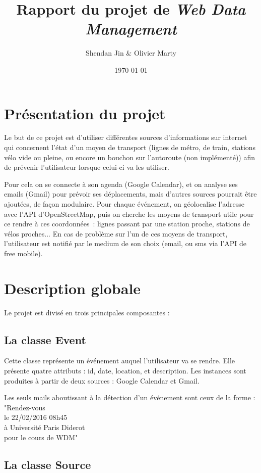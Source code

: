 \documentclass[a4paper, 8pt]{article}
\title{\vspace{-2cm}Rapport du projet de \emph{Web Data Management}}
\author{Shendan Jin \& Olivier Marty}
\date\today
\begin{document}
\maketitle

\section{Présentation du projet}

Le but de ce projet est d'utiliser différentes sources d'informations sur
internet qui concernent l'état d'un moyen de transport (lignes de
métro, de train, stations vélo vide ou pleine, ou encore un bouchon sur
l'autoroute (non implémenté)) afin de prévenir l'utilisateur lorsque celui-ci va
les utiliser.

Pour cela on se connecte à son agenda (Google Calendar), et on analyse ses emails
(Gmail) pour prévoir ses déplacements, mais d'autres sources pourrait être
ajoutées, de façon modulaire.
Pour chaque événement, on géolocalise l'adresse avec l'API d'OpenStreetMap,
puis on cherche les moyens de transport utile pour ce rendre à ces coordonnées~:
lignes passant par une station proche, stations de vélos proches...
En cas de problème sur l'un de ces moyens de transport, l'utilisateur est
notifié par le medium de son choix (email, ou sms via l'API de free mobile).

\section{Description globale}

Le projet est divisé en trois principales composantes :

\subsection{La classe Event}

Cette classe représente un événement auquel l'utilisateur va se rendre.
Elle présente quatre attributs : id, date, location, et description.
Les instances sont produites à partir de deux sources : Google Calendar et
Gmail.

Les seuls mails aboutissant à la détection d'un événement sont ceux de la forme :\\
"Rendez-vous\\
le 22/02/2016 08h45\\
à Université Paris Diderot\\
pour le cours de WDM"


\subsection{La classe Source}
\end{document}
